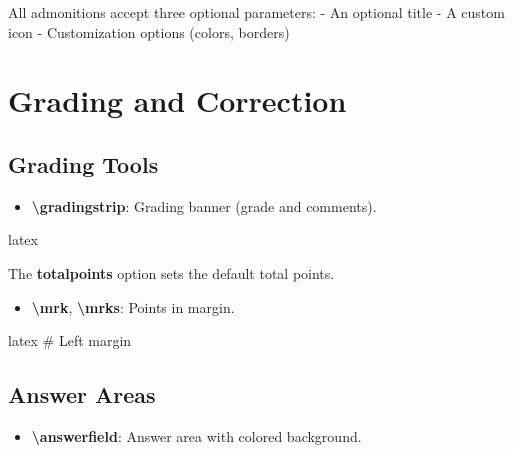 \documentclass[
    margin=2cm
]{neoschool}
\begin{document}
All admonitions accept three optional parameters: - An optional title -
A custom icon - Customization options (colors, borders)

\section{Grading and Correction}

\subsection{Grading Tools}

\begin{itemize}
\item
  \textbf{\textbackslash gradingstrip}: Grading banner (grade and comments).
\end{itemize}

\begin{code}{latex}
\gradingstrip

\gradingstrip[20]
\end{code}

The \textbf{totalpoints} option sets the default total points.


\begin{itemize}
\item
  \textbf{\textbackslash mrk}, \textbf{\textbackslash mrks}: Points in margin.
\end{itemize}

\begin{code}{latex}
                # Left margin

\end{code}

\subsection{Answer Areas}

\begin{itemize}
\item
  \textbf{\textbackslash answerfield}: Answer area with colored background.
\end{itemize}
\end{document}
